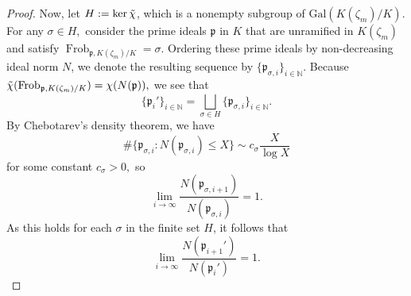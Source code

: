 \documentclass[12pt]{amsart}
\theoremstyle{definition}
\numberwithin{equation}{section}
\newcommand{\Gal}{\text{Gal}}
\newcommand{\ra}{\rightarrow}
\newcommand{\p}{\mathfrak{p}}
\newcommand{\Q}{\mathbb{Q}}
\newcommand{\Z}{\mathbb{Z}}
\newcommand{\N}{\mathbb{N}}
\newcommand{\Frob}{\operatorname{Frob}}
\begin{document}
\begin{proof}
    Now, let $H:= \ker \Tilde{\chi}$, which is a nonempty subgroup of $\Gal(K(\zeta_m)/K).$ For any $\sigma \in H,$ consider the prime ideals $\p$ in $K$ that are unramified in $K(\zeta_m)$ and satisfy $\Frob_{\p , K(\zeta_m)/K} = \sigma.$ Ordering these prime ideals by non-decreasing ideal norm $N$, we denote the resulting sequence by  $\{\p_{\sigma, i}\}_{i \in \N}.$ Because $\Tilde{\chi}(\Frob_{\p, K(\zeta_m)/K}) = \chi(N(\p)),$ we see that
    $$\{\p_i'\}_{ i \in \N} = \bigsqcup_{\sigma \in H} \{\p_{\sigma, i}\}_{i \in \N}.$$
    By Chebotarev's density theorem, we have $$\#\{\mathfrak p_{\sigma, i} : N(\mathfrak p_{\sigma,i}) \leq X\} \sim c_\sigma \frac{X}{\log X}$$ for some constant $c_\sigma > 0,$ so $$\lim_{i \ra \infty} \frac{N(\p_{\sigma, i+1})}{N(\p_{\sigma, i})} = 1.$$ As this holds for each $\sigma$ in the finite set $H$, it follows that $$\lim_{i \ra \infty} \frac{N(\p_{i+1}')}{N(\p_{i}')} = 1.$$

\end{proof}
\end{document}

